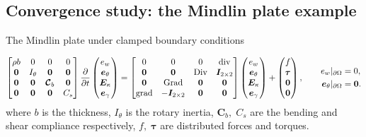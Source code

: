 \documentclass[aspectratio=169]{ISAE-Beamer}
\DeclareMathOperator*{\grad}{grad}
\DeclareMathOperator*{\Grad}{Grad}
\DeclareMathOperator*{\Div}{Div}
\renewcommand{\div}{\operatorname{div}}
\begin{document}
\subsection{Convergence study: the Mindlin plate example}


\begin{frame}{The Mindlin plate under clamped boundary conditions}

\begin{equation*}
	\begin{bmatrix}
	\rho b  & 0  & 0  & 0 \\
	\bm{0} & I_\theta &  \bm{0} & \bm{0}\\
	\bm{0}  & \bm{0}  & \bm{\mathcal{C}}_b  & \bm{0}\\
	\bm{0} & \bm{0} &  \bm{0} & C_s \\
	\end{bmatrix}
	\diffp{}{t}
	\begin{pmatrix}
	e_w \\
	\bm{e}_\theta \\
	\bm{E}_\kappa \\
	\bm{e}_{\gamma} \\
	\end{pmatrix} = 
	\begin{bmatrix}
	0  & 0  & 0  & \div \\
	\bm{0} & \bm{0} &  \Div & \bm{I}_{2 \times 2}\\
	\bm{0}  & \Grad  & \bm{0}  & \bm{0}\\
	\grad & -\bm{I}_{2 \times 2} &  \bm{0} & \bm{0} \\
	\end{bmatrix}
	\begin{pmatrix}
	e_w \\
	\bm{e}_{\theta} \\
	\bm{E}_{\kappa} \\
	\bm{e}_{\gamma} \\
	\end{pmatrix} + 
	\begin{pmatrix}
	f \\
	\bm{\tau} \\
	\bm{0} \\
	\bm{0} \\
	\end{pmatrix}, \qquad
	\begin{aligned}
	{e}_w\vert_{\partial\Omega} &= 0, \\
	\bm{e}_\theta\vert_{\partial\Omega} &= \bm{0}.
	\end{aligned}	
\end{equation*}
where $b$ is the thickness, $I_\theta$ is the rotary inertia, $\bm{C}_b, \; C_s$ are the bending and shear compliance  respectively, $f, \; \bm{\tau}$ are distributed forces and torques.
\vspace{.5cm}


\end{frame}
\end{document}
